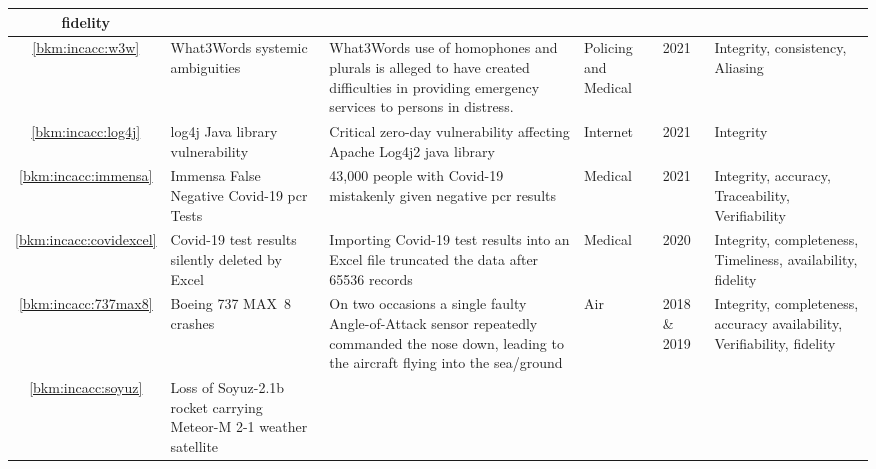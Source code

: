 \begin{longtable}{|C{}|L{}|L{}|L{}|L{}|L{}|}
  \gls{fidelity}\\
  \hline
  \ref{bkm:incacc:w3w} & What3Words systemic ambiguities &
  What3Words use of homophones and plurals is alleged to have created difficulties in providing emergency services
  to persons in distress.
  &
  Policing and Medical & 2021 & Integrity,
  \gls{consistency},
  Aliasing\\
  \hline
        \ref{bkm:incacc:log4j} & log4j Java library vulnerability &
        Critical zero-day vulnerability affecting Apache Log4j2 java library &
        Internet & 2021 & Integrity\\
        \hline
        \ref{bkm:incacc:immensa} & Immensa False Negative Covid-19 \gls{pcr} Tests &
        43,000 people with Covid-19 mistakenly given negative \gls{pcr} results &
        Medical & 2021 & Integrity, \gls{accuracy}, Traceability, Verifiability\\
        \hline
        \ref{bkm:incacc:covidexcel} & Covid-19 test results silently deleted by Excel &
        Importing Covid-19 test results into an Excel file truncated the data after 65536 records &
        Medical & 2020 & Integrity, \gls{completeness}, Timeliness, \gls{availability}, \gls{fidelity}\\
        \hline
	\ref{bkm:incacc:737max8} & Boeing 737 MAX~8 crashes &
	On two occasions a single faulty Angle-of-Attack sensor repeatedly commanded the nose down,
        leading to the aircraft flying into the sea/ground
	& Air & 2018 \& 2019 & Integrity, \gls{completeness}, \gls{accuracy}\vspace{1ex} \gls{availability}, Verifiability, \gls{fidelity}\\ 
	\hline
        \ref{bkm:incacc:soyuz} & Loss of Soyuz-2.1b rocket carrying Meteor-M 2-1 weather satellite &

\end{longtable}
